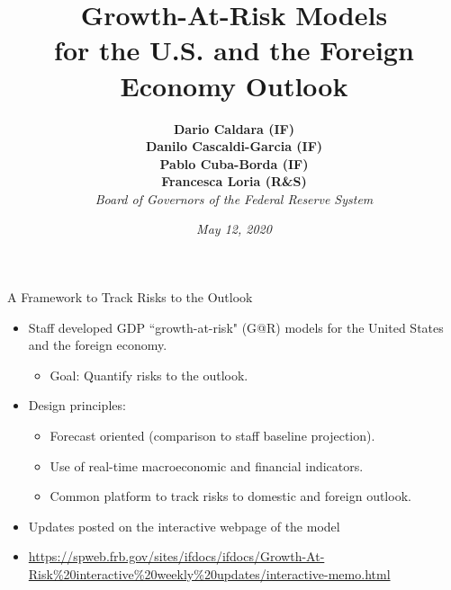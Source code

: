\documentclass[xcolor=dvipsnames, xcolor=table, 10pt]{beamer}
\newcommand{\bb}[1]{{\color{euiblue}#1}}
\newcommand{\rr}[1]{{\color{darkred}#1}}
\begin{document}
\playfair

\title[Growth-At-Risk Models]{\textbf{Growth-At-Risk Models\\ for the U.S. and the Foreign Economy Outlook}}
\thispagestyle{empty}
\author[Caldara, Cascaldi-Garcia, Cuba-Borda, Loria]{\textbf{Dario Caldara (IF)\\ Danilo Cascaldi-Garcia (IF)\\ Pablo Cuba-Borda (IF)\\ Francesca Loria (R\&S)}\\ \medskip \emph{Board of Governors of the Federal Reserve System}}

\date[May 12, 2020]{\emph{May 12, 2020}}

\maketitle


\setcounter{framenumber}{0}

\begin{frame}{A Framework to Track Risks to the Outlook}
\vspace*{0.12in}
\begin{itemize}
    \item Staff developed GDP ``growth-at-risk" (G@R) models for the United States and the foreign economy.
    \medskip
    \begin{itemize}
        \item {\bb{Goal:}} Quantify risks to the outlook.
    \end{itemize}
    \bigskip    
    \item Design principles:
    \bigskip
    \begin{itemize}
        \item Forecast oriented (comparison to staff baseline projection).
        \medskip
        \item Use of \rr{real-time} macroeconomic and financial indicators.
        \medskip
        \item Common platform to track risks to domestic and foreign outlook.
    \end{itemize}
    \bigskip
    \item Updates posted on the interactive webpage of the model
    \medskip
    \item[] \url{https://spweb.frb.gov/sites/ifdocs/ifdocs/Growth-At-Risk\%20interactive\%20weekly\%20updates/interactive-memo.html}

\end{itemize}

\end{frame}
\end{document}
